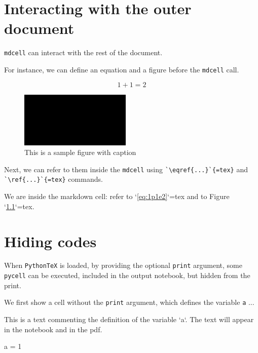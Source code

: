 \documentclass[oneside]{book}
\begin{document}
\chapter{Interacting with the outer document}

\texttt{mdcell} can interact with the rest of the document.

For instance, we can define an equation and a figure before the \texttt{mdcell} call.

\begin{equation}
1 + 1 = 2
\label{eq:1p1e2}
\end{equation}

\begin{figure}
\centering
\includegraphics[width=0.5\linewidth]{images/fail_image_verification.png}
\caption{This is a sample figure with caption}
\label{fig:black}
\end{figure}

Next, we can refer to them inside the \texttt{mdcell} using \verb|`\eqref{...}`{=tex}| and \verb|`\ref{...}`{=tex}| commands.

\begin{mdcell}
We are inside the markdown cell: refer to `\eqref{eq:1p1e2}`{=tex} and to Figure `\ref{fig:black}`{=tex}.
\end{mdcell}

\chapter{Hiding codes}

When \texttt{PythonTeX} is loaded, by providing the optional \texttt{print} argument, some \texttt{pycell} can be executed, included in the output notebook, but hidden from the print.

We first show a cell without the \texttt{print} argument, which defines the variable \texttt{a} ...

\begin{mdcell}
This is a text commenting the definition of the variable `a`. The text will appear in the notebook and in the pdf.
\end{mdcell}
\begin{pycell}
a = 1
\end{pycell}
\end{document}
